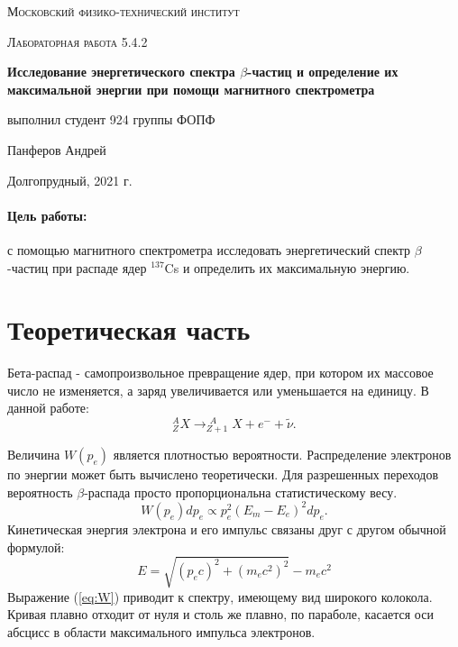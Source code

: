 \documentclass[a4paper, 12pt]{article}
\begin{document}
	
\begin{titlepage}
	\centering
	\vspace{5cm}
	{\scshape\LARGE Московский физико-технический институт \par}
	\vspace{4cm}
	{\scshape\Large Лабораторная работа 5.4.2 \par}
	\vspace{1cm}
	{\huge\bfseries Исследование энергетического спектра $\beta$-частиц и определение их максимальной энергии при помощи магнитного спектрометра \par}
	\vspace{1cm}
	\vfill
\begin{flushright}
	{\large выполнил студент 924 группы ФОПФ}\par
	\vspace{0.3cm}
	{\LARGE Панферов Андрей}
\end{flushright}
	

	\vfill

	Долгопрудный, 2021 г.
\end{titlepage}

\paragraph*{Цель работы:} с помощью магнитного спектрометра исследовать энергетический спектр $\beta$-частиц при распаде ядер $^{137}$Cs и определить их максимальную энергию.

\section*{Теоретическая часть}
	
	Бета-распад - самопроизвольное превращение ядер, при котором их массовое число не изменяется, а заряд увеличивается или уменьшается на единицу.
	В данной работе:
	$$^A_Z X \to ^{\ \, A}_{Z+1} X + e^- + \widetilde{\nu} .$$
	
	Величина $W(p_e)$ является плотностью вероятности. Распределение электронов по энергии может быть вычислено теоретически. Для разрешенных переходов вероятность $\beta$-распада просто пропорциональна статистическому весу.
	\begin{equation*}
		\label{eq:W}
		W(p_e)dp_e \propto p_e^2(E_m-E_e)^2 dp_e.
	\end{equation*}
	Кинетическая энергия электрона и его импульс связаны друг с другом обычной формулой:
	\begin{equation*}
		E = \sqrt{(p_ec)^2+(m_ec^2)^2}-m_ec^2
	\end{equation*}
	Выражение (\ref{eq:W}) приводит к спектру, имеющему вид широкого колокола. Кривая плавно отходит от нуля и столь же плавно, по параболе, касается оси абсцисс в области максимального импульса электронов.
	
\end{document}

